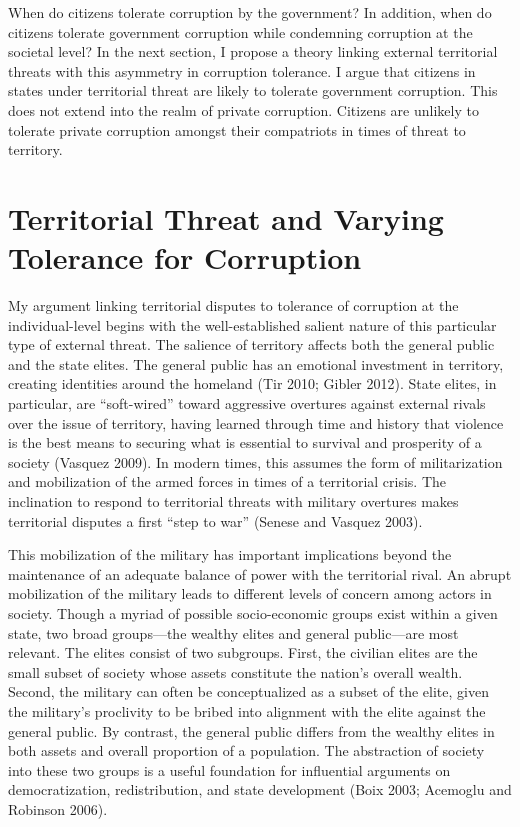 \documentclass[11pt,]{article}
\begin{document}
When do citizens tolerate corruption by the government? In addition,
when do citizens tolerate government corruption while condemning
corruption at the societal level? In the next section, I propose a
theory linking external territorial threats with this asymmetry in
corruption tolerance. I argue that citizens in states under territorial
threat are likely to tolerate government corruption. This does not
extend into the realm of private corruption. Citizens are unlikely to
tolerate private corruption amongst their compatriots in times of threat
to territory.

\section{Territorial Threat and Varying Tolerance for
Corruption}\label{territorial-threat-and-varying-tolerance-for-corruption}

My argument linking territorial disputes to tolerance of corruption at
the individual-level begins with the well-established salient nature of
this particular type of external threat. The salience of territory
affects both the general public and the state elites. The general public
has an emotional investment in territory, creating identities around the
homeland (Tir 2010; Gibler 2012). State elites, in particular, are
``soft-wired'' toward aggressive overtures against external rivals over
the issue of territory, having learned through time and history that
violence is the best means to securing what is essential to survival and
prosperity of a society (Vasquez 2009). In modern times, this assumes
the form of militarization and mobilization of the armed forces in times
of a territorial crisis. The inclination to respond to territorial
threats with military overtures makes territorial disputes a first
``step to war'' (Senese and Vasquez 2003).

This mobilization of the military has important implications beyond the
maintenance of an adequate balance of power with the territorial rival.
An abrupt mobilization of the military leads to different levels of
concern among actors in society. Though a myriad of possible
socio-economic groups exist within a given state, two broad groups---the
wealthy elites and general public---are most relevant. The elites
consist of two subgroups. First, the civilian elites are the small
subset of society whose assets constitute the nation's overall wealth.
Second, the military can often be conceptualized as a subset of the
elite, given the military's proclivity to be bribed into alignment with
the elite against the general public. By contrast, the general public
differs from the wealthy elites in both assets and overall proportion of
a population. The abstraction of society into these two groups is a
useful foundation for influential arguments on democratization,
redistribution, and state development (Boix 2003; Acemoglu and Robinson
2006).
\end{document}
